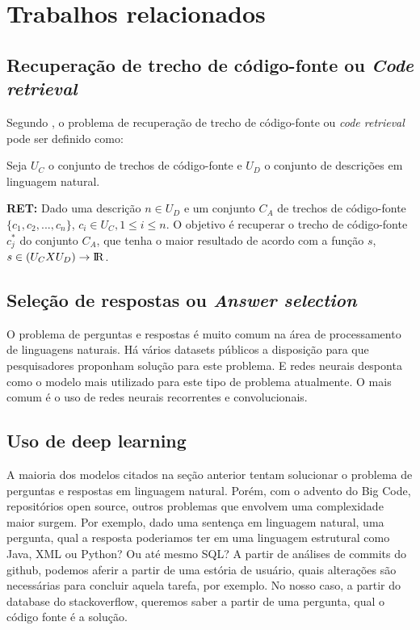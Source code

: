 \chapter{Trabalhos relacionados}
\label{cap:trabalhos-relacionados}



\section{Recuperação de trecho de código-fonte ou \textit{Code retrieval}}
\label{sec:code-retrieval}

Segundo \cite{iyer-etal-2016-summarizing}, o problema de recuperação de trecho de código-fonte ou \textit{code retrieval} pode ser definido como:

Seja $U_{C}$ o conjunto de trechos de código-fonte e $U_{D}$ o conjunto de descrições em linguagem natural. 

\textbf{RET:} Dado uma descrição $n \in U_{D}$ e um conjunto $C_{A}$ de trechos de código-fonte $\{c_{1}, c_{2}, ..., c_{n}\}$, $c_{i} \in U_{C}, 1 \leq i \leq n$. O objetivo é recuperar o trecho de código-fonte $c_{j}^{*}$ do conjunto $C_{A}$, que tenha o maior resultado de acordo com a função $s$, $s \in (U_{C} X U_{D}) \rightarrow \rm I\!R$.

\section{Seleção de respostas ou \textit{Answer selection}}
\label{sec:answer-selection}

O problema de perguntas e respostas é muito comum na área de processamento de linguagens naturais. Há vários datasets públicos a disposição para que pesquisadores proponham solução para este problema. E redes neurais desponta como o modelo mais utilizado para este tipo de problema atualmente. O mais comum é o uso de redes neurais recorrentes e convolucionais. 


\section{Uso de deep learning}
\label{sec:uso-deep-learning}

A maioria dos modelos citados na seção anterior tentam solucionar o problema de perguntas e respostas em linguagem natural. Porém, com o advento do Big Code, repositórios open source, outros problemas que envolvem uma complexidade maior surgem. Por exemplo, dado uma sentença em linguagem natural, uma pergunta, qual a resposta poderiamos ter em uma linguagem estrutural como Java, XML ou Python? Ou até mesmo SQL? A partir de análises de commits do github, podemos aferir a partir de uma estória de usuário, quais alterações são necessárias para concluir aquela tarefa, por exemplo. No nosso caso, a partir do database do stackoverflow, queremos saber a partir de uma pergunta, qual o código fonte é a solução.